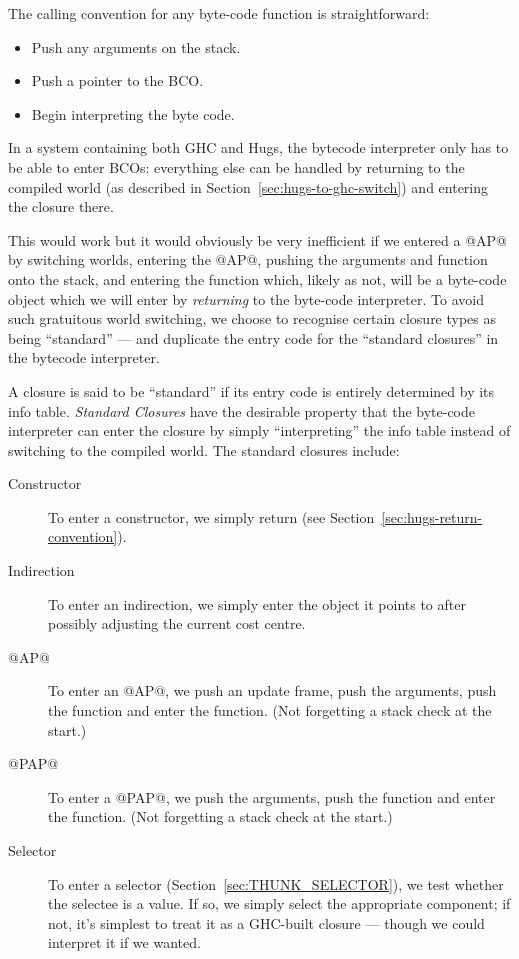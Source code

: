 \documentclass[11pt]{article}
\newcommand{\secref}[1]{Section~\ref{sec:#1}}
\begin{document}
The calling convention for any byte-code function is straightforward:
\begin{itemize}
\item Push any arguments on the stack.
\item Push a pointer to the BCO.
\item Begin interpreting the byte code.
\end{itemize}

In a system containing both GHC and Hugs, the bytecode interpreter
only has to be able to enter BCOs: everything else can be handled by
returning to the compiled world (as described in
\secref{hugs-to-ghc-switch}) and entering the closure
there.

This would work but it would obviously be very inefficient if we
entered a @AP@ by switching worlds, entering the @AP@, pushing the
arguments and function onto the stack, and entering the function
which, likely as not, will be a byte-code object which we will enter
by \emph{returning} to the byte-code interpreter.  To avoid such
gratuitous world switching, we choose to recognise certain closure
types as being ``standard'' --- and duplicate the entry code for the
``standard closures'' in the bytecode interpreter.

A closure is said to be ``standard'' if its entry code is entirely
determined by its info table.  \emph{Standard Closures} have the
desirable property that the byte-code interpreter can enter the
closure by simply ``interpreting'' the info table instead of switching
to the compiled world.  The standard closures include:

\begin{description}
\item[Constructor] To enter a constructor, we simply return (see
\secref{hugs-return-convention}).

\item[Indirection]
To enter an indirection, we simply enter the object it points to
after possibly adjusting the current cost centre.

\item[@AP@] 

To enter an @AP@, we push an update frame, push the
arguments, push the function and enter the function.
(Not forgetting a stack check at the start.)

\item[@PAP@]

To enter a @PAP@, we push the arguments, push the function and enter
the function.  (Not forgetting a stack check at the start.)

\item[Selector]

To enter a selector (\secref{THUNK_SELECTOR}), we test whether the
selectee is a value.  If so, we simply select the appropriate
component; if not, it's simplest to treat it as a GHC-built closure
--- though we could interpret it if we wanted.

\end{description}
\end{document}
